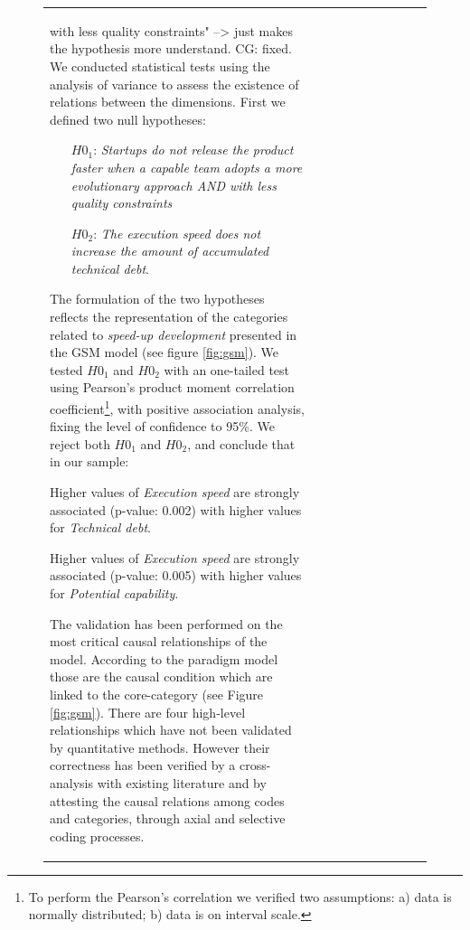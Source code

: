 \documentclass[12pt,journal,compsoc]{../sty/IEEEtran}
\begin{document}
\begin{table}[!t]
\begin{figure}[!t]
\begin{compactitem}
\begin{table}[!t]
\begin{tabular}{|l||c||c||c||c||c||c||c||c||c|}
with less quality constraints" --> just makes the hypothesis more  %
understand. CG: fixed. We conducted statistical tests  using the analysis of
variance to assess the  existence of relations between the dimensions. First we
defined two null  hypotheses:

\begin{itemize} \item[$H0_1$:] \textit{Startups do not release the product
faster  when a capable team adopts a more evolutionary approach AND with less
quality  constraints} \item[$H0_2$:] \textit{The execution speed does not
increase the amount  of accumulated technical debt}.  \end{itemize}

The formulation of the two hypotheses reflects the representation of the
categories related to \textit{speed-up development} presented in the GSM model
(see figure \ref{fig:gsm}). We tested $H0_1$ and $H0_2$  with an  one-tailed
test using Pearson's product moment correlation  coefficient\footnote{To perform
the Pearson's correlation we verified two  assumptions: a) data is normally
distributed; b) data is on interval scale.},  with positive association
analysis, fixing the level of confidence to 95\%. We reject both $H0_1$ and
$H0_2$, and conclude that in our sample: \begin{compactenum} \item Higher values
of \textit{Execution speed} are strongly associated  (p-value: 0.002) with
higher values for \textit{Technical debt}.

\item Higher values of \textit{Execution speed} are  strongly associated
(p-value: 0.005) with higher values for   \textit{Potential capability}.
\end{compactenum}

The validation has been performed on the most critical  causal relationships of
the model. According to the paradigm model those are the causal condition which
are linked to the core-category (see Figure \ref{fig:gsm}). There are four
high-level relationships  which have not been validated by quantitative
methods. However their correctness has been verified by a cross-analysis with
existing literature and by attesting the causal relations among codes and
categories, through axial and selective coding processes.



\end{tabular}
\end{table}
\end{compactitem}
\end{figure}
\end{table}
\end{document}
